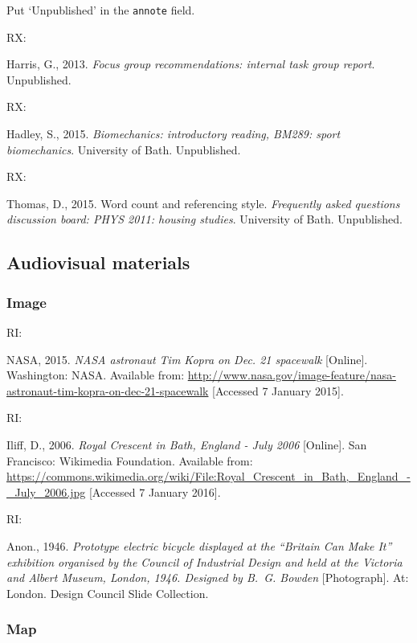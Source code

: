 Put `Unpublished' in the \texttt{annote} field.

RX: \cite{harris2013fgr}

Harris, G., 2013. \emph{Focus group recommendations: internal task group report}. Unpublished.


RX: \cite{hadley2015bir}

Hadley, S., 2015. \emph{Biomechanics: introductory reading, BM289: sport biomechanics}. University of Bath. Unpublished.


RX: \cite{thomas2015wcr}

Thomas, D., 2015. Word count and referencing style. \emph{Frequently asked questions discussion board: PHYS 2011: housing studies}. University of Bath. Unpublished.



\subsection{Audiovisual materials}

\subsubsection*{Image}

RI: \cite{nasa2015nat}

NASA, 2015. \emph{NASA astronaut Tim Kopra on Dec. 21 spacewalk} [Online]. Washington: NASA. Available from: \url{http://www.nasa.gov/image-feature/nasa-astronaut-tim-kopra-on-dec-21-spacewalk} [Accessed 7 January 2015].


RI: \cite{iliff2006rcb}

Iliff, D., 2006. \emph{Royal Crescent in Bath, England - July 2006} [Online]. San Francisco: Wikimedia Foundation. Available from: \url{https://commons.wikimedia.org/wiki/File:Royal_Crescent_in_Bath,_England_-_July_2006.jpg} [Accessed 7 January 2016].


RI: \cite{anon1946peb}

Anon., 1946. \emph{Prototype electric bicycle displayed at the \enquote{Britain Can Make It} exhibition organised by the Council of Industrial Design and held at the Victoria and Albert Museum, London, 1946. Designed by B.~G. Bowden} [Photograph]. At: London. Design Council Slide Collection.



\subsubsection*{Map}

